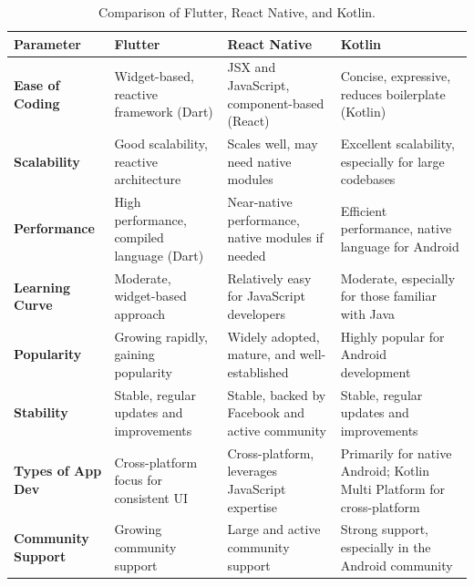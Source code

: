 \begin{table}[h]
    \centering
    \label{tab:comparison}
    \caption{Comparison of Flutter, React Native, and Kotlin.\cite{RNvsFluttervsKMP}}
    \begin{tabular}{|p{2.5cm}|p{4cm}|p{4cm}|p{4cm}|}
        \hline
        \textbf{Parameter}         & \textbf{Flutter}                           & \textbf{React Native}                             & \textbf{Kotlin}                                                        \\ \hline
        \textbf{Ease of Coding}    & Widget-based, reactive framework (Dart)    & JSX and JavaScript, component-based (React)       & Concise, expressive, reduces boilerplate (Kotlin)                      \\ \hline
        \textbf{Scalability}       & Good scalability, reactive architecture    & Scales well, may need native modules              & Excellent scalability, especially for large codebases                  \\ \hline
        \textbf{Performance}       & High performance, compiled language (Dart) & Near-native performance, native modules if needed & Efficient performance, native language for Android                     \\ \hline
        \textbf{Learning Curve}    & Moderate, widget-based approach            & Relatively easy for JavaScript developers         & Moderate, especially for those familiar with Java                      \\ \hline
        \textbf{Popularity}        & Growing rapidly, gaining popularity        & Widely adopted, mature, and well-established      & Highly popular for Android development                                 \\ \hline
        \textbf{Stability}         & Stable, regular updates and improvements   & Stable, backed by Facebook and active community   & Stable, regular updates and improvements                               \\ \hline
        \textbf{Types of App Dev}  & Cross-platform focus for consistent UI     & Cross-platform, leverages JavaScript expertise    & Primarily for native Android; Kotlin Multi Platform for cross-platform \\ \hline
        \textbf{Community Support} & Growing community support                  & Large and active community support                & Strong support, especially in the Android community                    \\ \hline
    \end{tabular}
\end{table}


